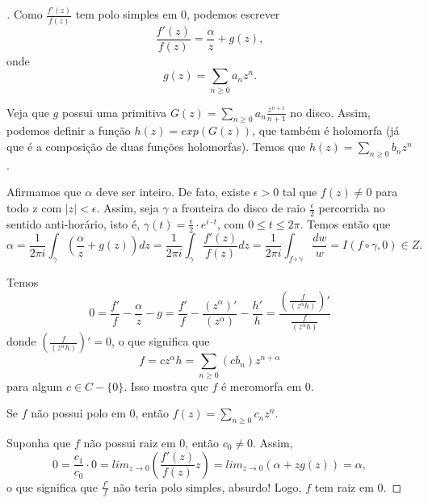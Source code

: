 \begin{proof}[]

Como $\frac{f'(z)}{f(z)}$ tem polo simples em $0$, podemos escrever $$\frac{f'(z)}{f(z)}=\frac{\alpha}{z}+g(z),$$ onde $$g(z)=\sum_{n\geq 0}a_nz^n.$$

Veja que $g$ possui uma primitiva $G(z)=\sum_{n\geq 0}a_n\frac{z^{n+1}}{n+1}$ no disco. Assim, podemos definir a função $h(z)=exp(G(z))$, que também é holomorfa (já que é a composição de duas funções holomorfas). Temos que $h(z)=\sum_{n\geq 0}b_nz^n$.

Afirmamos que $\alpha$ deve ser inteiro. De fato, existe $\epsilon>0$ tal que $f(z)\neq 0$ para todo z com $\lvert z\rvert <\epsilon$. Assim, seja $\gamma$ a fronteira do disco de raio $\frac{\epsilon}{2}$ percorrida no sentido anti-horário, isto é, $\gamma(t)=\frac{\epsilon}{2}\cdot e^{i\cdot t}$, com $0\leq t\leq 2\pi$. Temos então que $$\alpha=\frac{1}{2\pi i}\int_{\gamma}\left(\frac{\alpha}{z}+g(z)\right) dz=\frac{1}{2\pi i}\int_{\gamma}\frac{f'(z)}{f(z)}dz=\frac{1}{2\pi i}\int_{f\circ\gamma}\frac{dw}{w}=I(f \circ \gamma, 0)\in Z.$$

Temos $$0=\frac{f'}{f}-\frac{\alpha}{z}-g=\frac{f'}{f}-\frac{(z^{\alpha})'}{(z^{\alpha})}-\frac{h'}{h}=\frac{(\frac{f}{(z^{\alpha}h)})'}{\frac{f}{(z^{\alpha}h)}}$$ donde $(\frac{f}{(z^{\alpha}h)})'=0$, o que significa que $$f=cz^{\alpha}h=\sum_{n \geq 0}(cb_n)z^{n+\alpha}$$ para algum $c\in C-\{0\}$. Isso mostra que $f$ é meromorfa em $0$.

Se $f$ não possui polo em $0$, então $f(z)=\sum_{n\geq 0}c_nz^n$.

Suponha que $f$ não possui raiz em $0$, então $c_0\neq 0$. Assim, $$0=\frac{c_1}{c_0}\cdot 0=lim_{z\rightarrow 0}\left(\frac{f'(z)}{f(z)}z\right)=lim_{z\rightarrow 0}\left(\alpha+zg(z)\right)=\alpha,$$ o que significa que $\frac{f'}{f}$ não teria polo simples, absurdo! Logo, $f$ tem raiz em $0$.

\end{proof}
